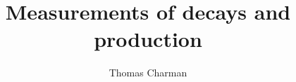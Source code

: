 \documentclass[a4paper,12pt, oneside]{memoir}
\begin{document}
\title{Measurements of \Hbb decays and \VH production}

\author{Thomas Charman}
\submitdate{\today}

\doublespacing
\maketitle



\setcounter{tocdepth}{3}
\tableofcontents*
\listoffigures
\listoftables







\clearpage

\begin{appendices}
\end{appendices}
\end{document}
